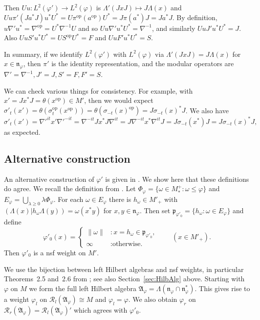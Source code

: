 \documentclass[a4paper,11pt]{article}
\theoremstyle{plain}
\theoremstyle{remark}
\newcommand{\mc}[1]{\mathcal{#1}}
\newcommand{\mf}[1]{\mathfrak{#1}}
\newcommand{\op}{{\operatorname{op}}}
\begin{document}
Then $Uu \colon L^2(\varphi') \to L^2(\varphi)$ is $\Lambda'(JxJ) \mapsto J\Lambda(x)$ and $Uu\pi'(Ja^*J)u^*U^* = U \pi^\op(a^\op) U^* = J\pi(a^*)J = Ja^*J$.  By definition, $u \nabla' u^* = \nabla^\op = U^*\nabla^{-1}U$ and so $Uu \nabla' u^*U^* = \nabla^{-1}$, and similarly $Uu J' u^*U^* = J$.  Also $Uu S' u^*U^* = US^\op U^* = F$ and $Uu F' u^*U^* = S$.

In summary, if we identify $L^2(\varphi')$ with $L^2(\varphi)$ via $\Lambda'(JxJ) = J\Lambda(x)$ for $x\in\mf n_\varphi$, then $\pi'$ is the identity representation, and the modular operators are $\nabla' = \nabla^{-1}, J' = J, S' = F, F' = S$.

We can check various things for consistency.  For example, with $x' = Jx^*J  = \theta(x^\op) \in M'$, then we would expect $\sigma'_t(x') = \theta(\sigma^\op_t(x^\op)) = \theta(\sigma_{-t}(x)^\op) = J \sigma_{-t}(x)^* J$.  We also have
\[ \sigma'_t(x')
= \nabla'^{it} x' \nabla'^{-it}
= \nabla^{-it} Jx^*J \nabla^{it}
= J \nabla^{-it} x^* \nabla^{it} J
= J \sigma_{-t}(x^*) J
= J \sigma_{-t}(x)^* J, \]
as expected.


\subsection{Alternative construction}

An alternative construction of $\varphi'$ is given in \cite[Theorem~VII.1.17]{TakesakiII}.  We show here that these definitions do agree.  We recall the definition from \cite{TakesakiII}.  Let $\Phi_{\varphi} = \{ \omega \in M_*^+ : \omega\leq\varphi \}$ and $E_\varphi = \bigcup_{\lambda\geq 0} \lambda\Phi_{\varphi}$.  For each $\omega\in E_\varphi$ there is $h_\omega \in M'_+$ with $(\Lambda(x)|h_\omega\Lambda(y)) = \omega(x^*y)$ for $x,y\in\mf n_\varphi$.  Then set $\mf p_{\varphi'_0} = \{ h_\omega : \omega\in E_\varphi \}$ and define
\[ \varphi'_0(x) = \begin{cases} \|\omega\| &: x = h_\omega \in \mf p_{\varphi'_0}, \\
  \infty &: \text{otherwise.} \end{cases} \qquad (x\in M'_+). \]
Then $\varphi'_0$ is a nsf weight on $M'$.

We use the bijection between left Hilbert algebras and nsf weights, in particular Theorems~2.5 and~2.6 from \cite[Section~VII]{TakesakiII}; see also Section~\ref{sec:HilbAlg} above.
Starting with $\varphi$ on $M$ we form the full left Hilbert algebra $\mf A_\varphi = \Lambda(\mf n_\varphi \cap \mf n_\varphi^*)$.  This gives rise to a weight $\varphi_l$ on $\mc R_l(\mf A_\varphi) \cong M$ and $\varphi_l = \varphi$.  We also obtain $\varphi_r$ on $\mc R_r(\mf A_\varphi) = \mc R_l(\mf A_\varphi)'$ which agrees with $\varphi'_0$.  %
\end{document}
